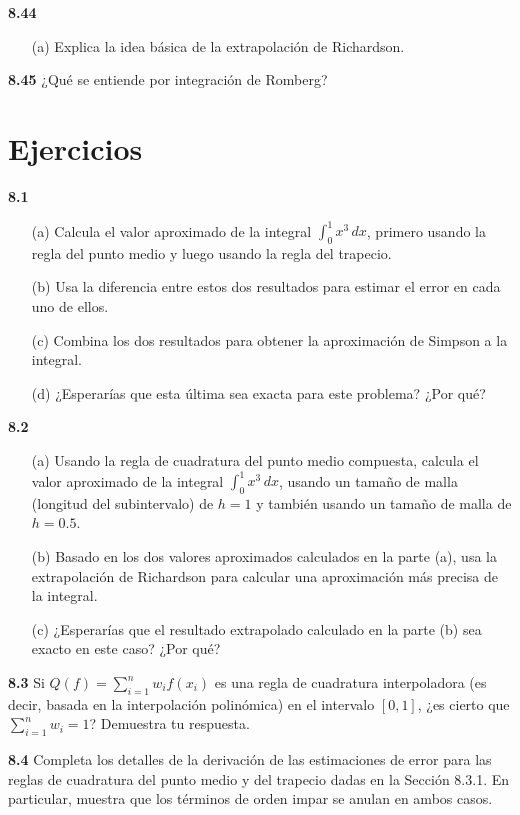 \documentclass{article}
\begin{document}
\textbf{8.44}
\begin{itemize}
    \item[(a)] Explica la idea básica de la extrapolación de Richardson.
\end{itemize}

\textbf{8.45} ¿Qué se entiende por integración de Romberg?


\section{Ejercicios}
\textbf{8.1}
\begin{itemize}
    \item[(a)] Calcula el valor aproximado de la integral \(\int_0^1 x^3 \, dx\), primero usando la regla del punto medio y luego usando la regla del trapecio.
    \item[(b)] Usa la diferencia entre estos dos resultados para estimar el error en cada uno de ellos.
    \item[(c)] Combina los dos resultados para obtener la aproximación de Simpson a la integral.
    \item[(d)] ¿Esperarías que esta última sea exacta para este problema? ¿Por qué?
\end{itemize}

\textbf{8.2}
\begin{itemize}
    \item[(a)] Usando la regla de cuadratura del punto medio compuesta, calcula el valor aproximado de la integral \(\int_0^1 x^3 \, dx\), usando un tamaño de malla (longitud del subintervalo) de \(h = 1\) y también usando un tamaño de malla de \(h = 0.5\).
    \item[(b)] Basado en los dos valores aproximados calculados en la parte (a), usa la extrapolación de Richardson para calcular una aproximación más precisa de la integral.
    \item[(c)] ¿Esperarías que el resultado extrapolado calculado en la parte (b) sea exacto en este caso? ¿Por qué?
\end{itemize}

\textbf{8.3} Si \(Q(f) = \sum_{i=1}^n w_i f(x_i)\) es una regla de cuadratura interpoladora (es decir, basada en la interpolación polinómica) en el intervalo \([0, 1]\), ¿es cierto que \(\sum_{i=1}^n w_i = 1\)? Demuestra tu respuesta.

\textbf{8.4} Completa los detalles de la derivación de las estimaciones de error para las reglas de cuadratura del punto medio y del trapecio dadas en la Sección 8.3.1. En particular, muestra que los términos de orden impar se anulan en ambos casos.
\end{document}
